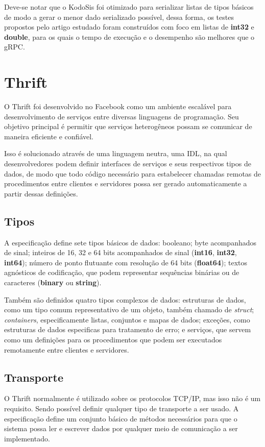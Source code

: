 Deve-se notar que o KodoSis foi otimizado para serializar listas de tipos básicos de modo a gerar o menor dado serializado possível, dessa forma, os testes propostos pelo artigo estudado foram construídos com foco em listas de \textbf{int32} e \textbf{double}, para os quais o tempo de execução e o desempenho são melhores que o gRPC.

\section{Thrift}

O Thrift \cite{slee_thrift_nodate} foi desenvolvido no Facebook como um ambiente escalável para desenvolvimento de serviços entre diversas linguagens de programação. Seu objetivo principal é permitir que serviços heterogêneos possam se comunicar de maneira eficiente e confiável.

Isso é solucionado através de uma linguagem neutra, uma IDL, na qual desenvolvedores podem definir interfaces de serviços e seus respectivos tipos de dados, de modo que todo código necessário para estabelecer chamadas remotas de procedimentos entre clientes e servidores possa ser gerado automaticamente a partir dessas definições.

\subsection{Tipos}
A especificação define sete tipos básicos de dados: booleano; byte acompanhados de sinal; inteiros de 16, 32 e 64 bits acompanhados de sinal  (\textbf{int16}, \textbf{int32}, \textbf{int64}); número de ponto flutuante com resolução de 64 bits (\textbf{float64}); textos agnósticos de codificação, que podem representar sequências binárias ou de caracteres (\textbf{binary} ou \textbf{string}).

Também são definidos quatro tipos complexos de dados: estruturas de dados, como um tipo comum representativo de um objeto, também chamado de \textit{struct}; \textit{containers}, especificamente listas, conjuntos e mapas de dados; exceções, como estruturas de dados especificas para tratamento de erro; e serviços, que servem como um definições para os procedimentos que podem ser executados remotamente entre clientes e servidores.

\subsection{Transporte}
O Thrift normalmente é utilizado sobre os protocolos TCP/IP, mas isso não é um requisito. Sendo possível definir qualquer tipo de transporte a ser usado. A especificação define um conjunto básico de métodos necessários para que o sistema possa ler e escrever dados por qualquer meio de comunicação a ser implementado.

